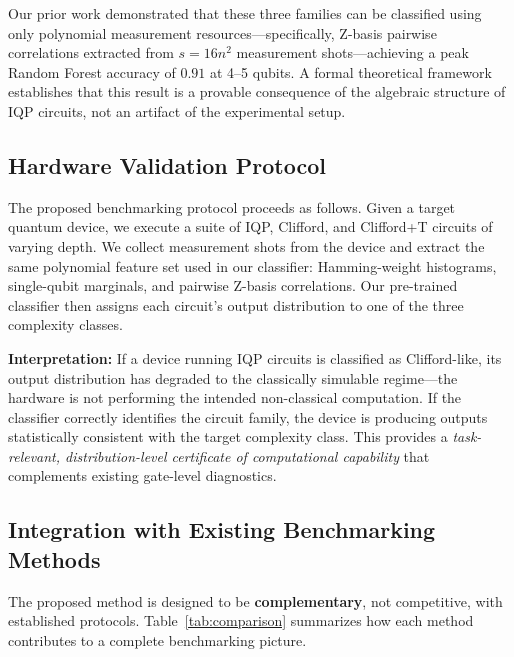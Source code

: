 \documentclass[11pt,twocolumn]{article}
\begin{document}
Our prior work demonstrated that these three families
can be classified using only polynomial measurement
resources---specifically, Z-basis pairwise correlations
extracted from $s = 16n^2$ measurement shots---achieving
a peak Random Forest accuracy of $0.91$ at 4--5 qubits.
A formal theoretical framework establishes that this
result is a provable consequence of the algebraic
structure of IQP circuits, not an artifact of the
experimental setup.

\subsection{Hardware Validation Protocol}

The proposed benchmarking protocol proceeds as follows.
Given a target quantum device, we execute a suite of
IQP, Clifford, and Clifford+T circuits of varying depth.
We collect measurement shots from the device and extract
the same polynomial feature set used in our classifier:
Hamming-weight histograms, single-qubit marginals, and
pairwise Z-basis correlations. Our pre-trained classifier
then assigns each circuit's output distribution to one of
the three complexity classes.

\textbf{Interpretation:} If a device running IQP circuits
is classified as Clifford-like, its output distribution
has degraded to the classically simulable regime---the
hardware is not performing the intended non-classical
computation. If the classifier correctly identifies the
circuit family, the device is producing outputs
statistically consistent with the target complexity class.
This provides a \textit{task-relevant, distribution-level
certificate of computational capability} that complements
existing gate-level diagnostics.

\subsection{Integration with Existing Benchmarking Methods}

The proposed method is designed to be \textbf{complementary},
not competitive, with established protocols. Table~\ref{tab:comparison}
summarizes how each method contributes to a complete
benchmarking picture.
\end{document}
